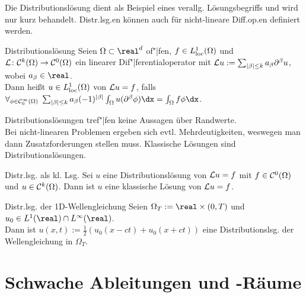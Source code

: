 \linie

\begin{Bem}
    Die Distributionslösung dient als Beispiel eines verallg. Lösungsbegriffs
    und wird nur kurz behandelt.
    Distr.lsg.en können auch für nicht-lineare Diff.op.en definiert werden.
\end{Bem}

\begin{Def}{Distributionslösung}
    Seien $\Omega \subset \real^d$ of"|fen, $f \in L^1_{\text{loc}}(\Omega)$ und
    $\mathcal{L}\colon \mathcal{C}^k(\Omega) \to \mathcal{C}^0(\Omega)$ ein linearer Dif"|ferentialoperator
    mit $\mathcal{L} u := \sum_{|\beta| \le k} a_{\beta} \partial^\beta u$, wobei $a_\beta \in \real$.\\
    Dann heißt $u \in L^1_{\text{loc}}(\Omega)$  von $\mathcal{L} u = f$, falls\\
    $\forall_{\phi \in \C^\infty_0(\Omega)}\;
    \sum_{|\beta| \le k} a_\beta (-1)^{|\beta|} \int_\Omega u (\partial^\beta \phi) \dx =
    \int_\Omega f\phi \dx$.
\end{Def}

\begin{Bem}
    Distributionslösungen tref"|fen keine Aussagen über Randwerte.\\
    Bei nicht-linearen Problemen ergeben sich evtl. Mehrdeutigkeiten, weswegen man dann
    Zusatzforderungen stellen muss.
    Klassische Lösungen sind Distributionslösungen.
\end{Bem}

\begin{Satz}{Distr.lsg. als kl. Lsg.}
    Sei $u$ eine Distributionslösung von $\mathcal{L} u = f$ mit $f \in \mathcal{C}^0(\Omega)$ und
    $u \in \mathcal{C}^k(\Omega)$.
    Dann ist $u$ eine klassische Lösung von $\mathcal{L} u = f$.
\end{Satz}

\begin{Satz}{Distr.lsg. der 1D-Wellengleichung}
   Seien $\Omega_T := \real \times (0, T)$ und $u_0 \in L^1(\real) \cap L^\infty(\real)$.\\
   Dann ist $u(x, t) := \frac{1}{2} (u_0(x - ct) + u_0(x + ct))$ eine
   Distributionslsg. der Wellengleichung in $\Omega_T$.
\end{Satz}

\pagebreak

\section{%
    Schwache Ableitungen und -Räume%
}


